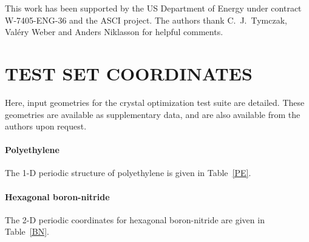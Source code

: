 \twolinestyle{\documentclass[prb,preprint]{revtex4}}
\begin{document}
\begin{acknowledgments}
 This work has been supported by the US Department of Energy 
 under contract W-7405-ENG-36 and the ASCI project.  The authors
 thank C.~J.~Tymczak, Val\'ery Weber and Anders Niklasson for helpful 
 comments.
\end{acknowledgments}


%

\appendix

\section{TEST SET COORDINATES}\label{Geometries}

Here, input geometries for the crystal optimization test suite are detailed.  These
geometries are available as supplementary data, and are also available from the
authors upon request.

\paragraph{Polyethylene}
The 1-D periodic structure of polyethylene is given in Table~\ref{PE}.
\paragraph{Hexagonal boron-nitride}
The 2-D periodic coordinates for hexagonal boron-nitride are given in Table~\ref{BN}.
\end{document}
